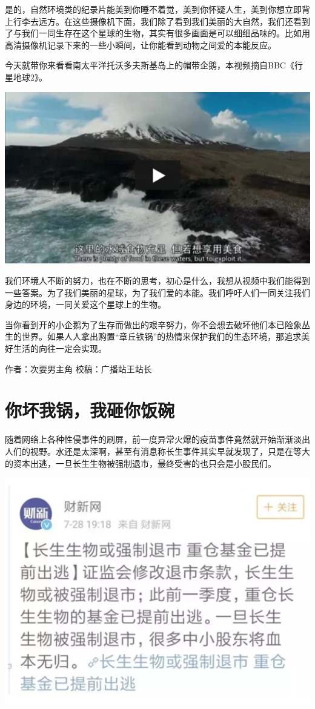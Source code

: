 \documentclass[]{book}
\begin{document}
是的，自然环境类的纪录片能美到你睡不着觉，美到你怀疑人生，美到你想立即背上行李去远方。在这些摄像机下面，我们除了看到我们美丽的大自然，我们还看到了与我们一同生存在这个星球的生物，其实有很多画面是可以细细品味的。比如用高清摄像机记录下来的一些小瞬间，让你能看到动物之间爱的本能反应。

今天就带你来看看南太平洋托沃多夫斯基岛上的帽带企鹅，本视频摘自BBC《行星地球2》。

\includegraphics[width=8.33in]{images/xf5}

我们环境人不断的努力，也在不断的思考，初心是什么，我想从视频中我们能得到一些答案。为了我们美丽的星球，为了我们爱的本能。我们呼吁人们一同关注我们身边的环境，一同关爱这个星球上的生物。

当你看到开的小企鹅为了生存而做出的艰辛努力，你不会想去破坏他们本已险象丛生的世界。如果人人拿出购置``章丘铁锅''的热情来保护我们的生态环境，那追求美好生活的向往一定会实现。

作者：次要男主角 校稿：广播站王站长

\section{你坏我锅，我砸你饭碗}

随着网络上各种性侵事件的刷屏，前一度异常火爆的疫苗事件竟然就开始渐渐淡出人们的视野。水还是太深啊，甚至有消息称长生事件其实早就发现了，只是在等大的资本出逃，一旦长生生物被强制退市，最终受害的也只会是小股民们。

\includegraphics[width=6.67in]{images/fw1}
\end{document}
